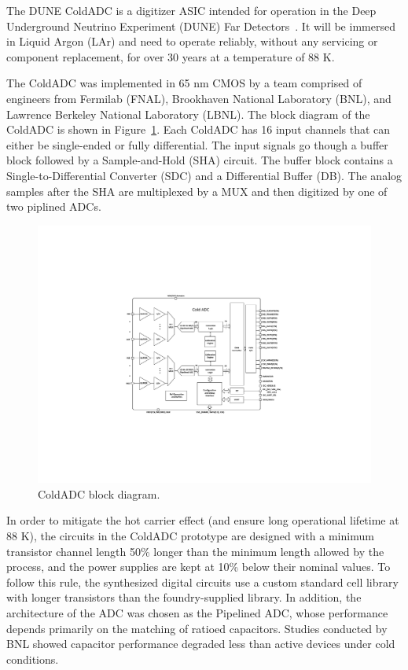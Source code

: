 \label{sec:1}

The DUNE ColdADC is a digitizer ASIC intended for operation in the Deep Underground Neutrino Experiment (DUNE) Far Detectors~\cite{dunecdr}. It will be immersed in Liquid Argon (LAr) and need to operate reliably, without any servicing or component replacement, for over 30 years at a temperature of 88 K.

The ColdADC was implemented in 65 nm CMOS by a team comprised of engineers from Fermilab (FNAL), Brookhaven National Laboratory (BNL), and Lawrence Berkeley National Laboratory (LBNL). The block diagram of the ColdADC is shown in Figure~\ref{fig:coldadc_blockdiagram}.
Each ColdADC has 16 input channels that can either be single-ended or fully differential. The input signals go though a buffer block followed by a Sample-and-Hold (SHA) circuit. The buffer block contains a Single-to-Differential Converter (SDC) and a Differential Buffer (DB). The analog samples after the SHA are multiplexed by a MUX and then digitized by one of two piplined ADCs.
\begin{figure}[h!]
\centering
  \includegraphics[width=0.8\linewidth]{figures/coldadc_blockdiagram.pdf}
  \caption{ColdADC block diagram.}
  \label{fig:coldadc_blockdiagram}
\end{figure}

In order to mitigate the hot carrier effect (and ensure long operational lifetime at 88 K), the circuits in the ColdADC prototype
are designed with a minimum transistor channel 
length 50\% longer than the minimum length allowed by the process, and the power supplies are kept at 10\% below their nominal 
values. To follow this rule, the synthesized digital circuits use a custom standard cell library with longer 
transistors than the foundry-supplied library. In addition, the architecture of the ADC was chosen as the Pipelined ADC, whose 
performance depends primarily on the matching of ratioed capacitors. Studies conducted by BNL showed capacitor performance 
degraded less than active devices under cold conditions. 

